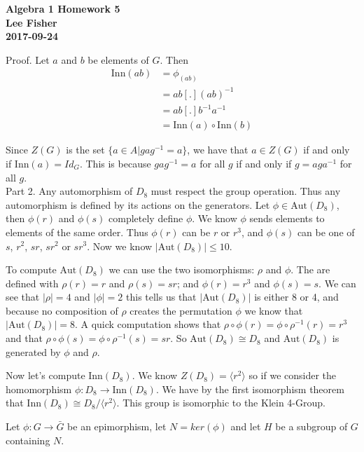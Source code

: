 \documentclass[12pt]{report}
\begin{document}
\textbf{Algebra 1 Homework 5}\\
\indent \textbf{Lee Fisher}\\
\indent \textbf{2017-09-24}

\vspace{0.3cm}

 Proof. Let $a$ and $b$ be elements of $G$. Then
\begin{align*}
   \textrm{Inn}(ab) &= \phi_(ab)\\
                    &= ab [.] (ab)^{-1}\\
                    &= ab [.] b^{-1}a^{-1}\\
                    &= \textrm{Inn}(a) \circ \textrm{Inn}(b)
\end{align*}

Since $Z(G)$ is the set $\{ a \in A | gag^{-1} = a\}$, we have that $a \in Z(G)$
if and only if $\textrm{Inn}(a) = Id_G$. This is because $gag^{-1} = a$ for all
$g$ if and only if $g = aga^{-1}$ for all $g$.\\

Part 2. Any automorphism of $D_8$ must respect the group operation. Thus any
automorphism is defined by its actions on the generators. Let $\phi \in
\textrm{Aut}(D_8)$, then $\phi(r)$ and $\phi(s)$ completely define $\phi$.
We know $\phi$ sends elements to elements of the same order. Thus $\phi(r)$ can
be $r$ or $r^3$, and $\phi(s)$ can be one of $s$, $r^2$, $sr$, $sr^2$ or $sr^3$.
Now we know $|\textrm{Aut}(D_8)| \leq 10$.

To compute $\textrm{Aut}(D_8)$ we can use the two isomorphisms: $\rho$ and
$\phi$. The are defined with $\rho(r) = r$ and $\rho(s) = sr$; and $\phi(r) =
r^3$ and $\phi(s) = s$. We can see that $|\rho| = 4$ and $|\phi|=2$ this tells
us that $|\textrm{Aut}(D_8)|$ is either 8 or 4, and because no composition of
$\rho$ creates the permutation $\phi$ we know that $|\textrm{Aut}(D_8)| = 8$.
A quick computation shows that $\rho\circ\phi(r)=\phi\circ\rho^{-1}(r)=r^3$
and that $\rho\circ\phi(s)=\phi\circ\rho^{-1}(s)=sr$. So $\textrm{Aut}(D_8)
\cong D_8$ and $\textrm{Aut}(D_8)$ is generated by $\phi$ and $\rho$.

Now let's compute $\textrm{Inn}(D_8)$. We know $Z(D_8) = \langle r^2 \rangle$ so
if we consider the homomorphism $\phi: D_8 \to \textrm{Inn}(D_8)$. We have by
the first isomorphism theorem that $\textrm{Inn}(D_8) \cong D_8 / \langle r^2
\rangle$. This group is isomorphic to the Klein 4-Group.


 Let $\phi : G \to \bar{G}$ be an epimorphism, let $N =
ker(\phi)$ and let $H$ be a subgroup of $G$ containing $N$.
\end{document}
